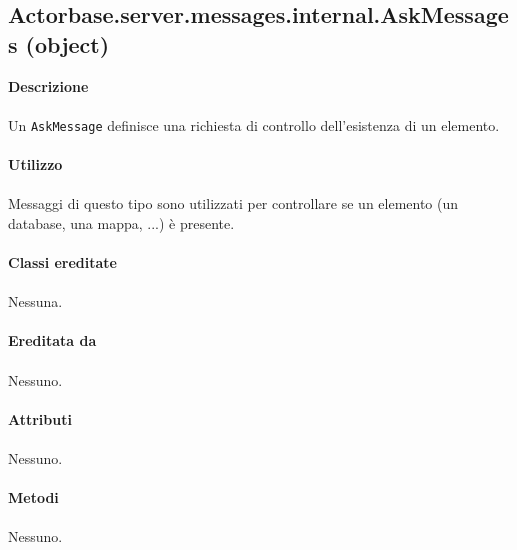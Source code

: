 \documentclass[a4paper]{article}
\begin{document}
	\subsection{Actorbase.server.messages.internal.AskMessages (object)}
		\textbf{Descrizione}
			\\ \\
			Un \texttt{AskMessage} definisce una richiesta di controllo dell'esistenza di un elemento.
			\\ \\
		\textbf{Utilizzo}
			\\ \\
			Messaggi di questo tipo sono utilizzati per controllare se un elemento (un database, una mappa, ...) è presente.
			\\ \\
		\textbf{Classi ereditate}
			\\ \\
			Nessuna.
			\\ \\
		\textbf{Ereditata da}
			\\ \\
			Nessuno.
			\\ \\
		\textbf{Attributi}
			\\ \\
			Nessuno.
			\\ \\
		\textbf{Metodi}
			\\ \\
			Nessuno.		
		
\end{document}
